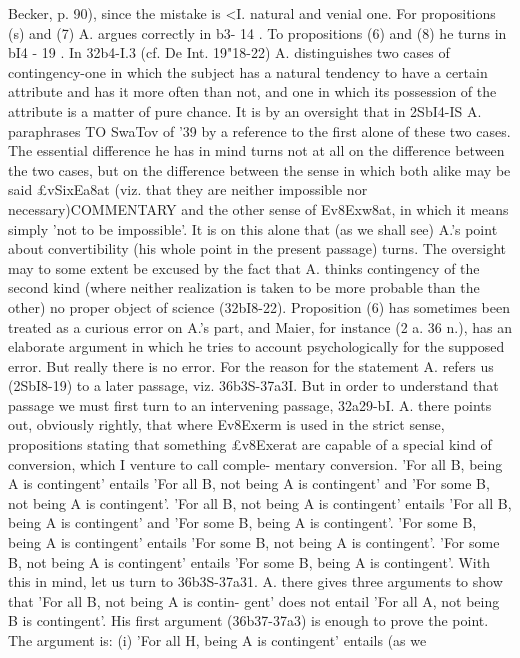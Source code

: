 {{Becker, p. 90), since the mistake is <I. natural and venial one.
For propositions (s) and (7) A. argues correctly in b3- 14 . To
propositions (6) and (8) he turns in bI4 - 19 . In 32b4-I.3 (cf. De Int.
19"18-22) A. distinguishes two cases of contingency-one in which
the subject has a natural tendency to have a certain attribute and
has it more often than not, and one in which its possession of the
attribute is a matter of pure chance. It is by an oversight that
in 2SbI4-IS A. paraphrases TO SwaTov of '39 by a reference to the
first alone of these two cases. The essential difference he has in
mind turns not at all on the difference between the two cases, but
on the difference between the sense in which both alike may be
said £vSixEa8at (viz. that they are neither impossible nor necessary)COMMENTARY
and the other sense of Ev8Exw8at, in which it means simply 'not
to be impossible'. It is on this alone that (as we shall see) A.'s
point about convertibility (his whole point in the present passage)
turns. The oversight may to some extent be excused by the fact
that A. thinks contingency of the second kind (where neither
realization is taken to be more probable than the other) no
proper object of science (32bI8-22).
Proposition (6) has sometimes been treated as a curious error
on A.'s part, and Maier, for instance (2 a. 36 n.), has an elaborate
argument in which he tries to account psychologically for the
supposed error. But really there is no error. For the reason for
the statement A. refers us (2SbI8-19) to a later passage, viz.
36b3S-37a3I. But in order to understand that passage we must
first turn to an intervening passage, 32a29-bI. A. there points
out, obviously rightly, that where Ev8Exerm is used in the strict
sense, propositions stating that something £v8Exerat are capable
of a special kind of conversion, which I venture to call comple-
mentary conversion.
'For all B, being A is contingent' entails 'For all B, not being
A is contingent' and 'For some B, not being A is contingent'.
'For all B, not being A is contingent' entails 'For all B, being
A is contingent' and 'For some B, being A is contingent'.
'For some B, being A is contingent' entails 'For some B, not
being A is contingent'.
'For some B, not being A is contingent' entails 'For some B,
being A is contingent'.
With this in mind, let us turn to 36b3S-37a31. A. there gives
three arguments to show that 'For all B, not being A is contin-
gent' does not entail 'For all A, not being B is contingent'. His
first argument (36b37-37a3) is enough to prove the point. The
argument is: (i) 'For all H, being A is contingent' entails (as we
}}
